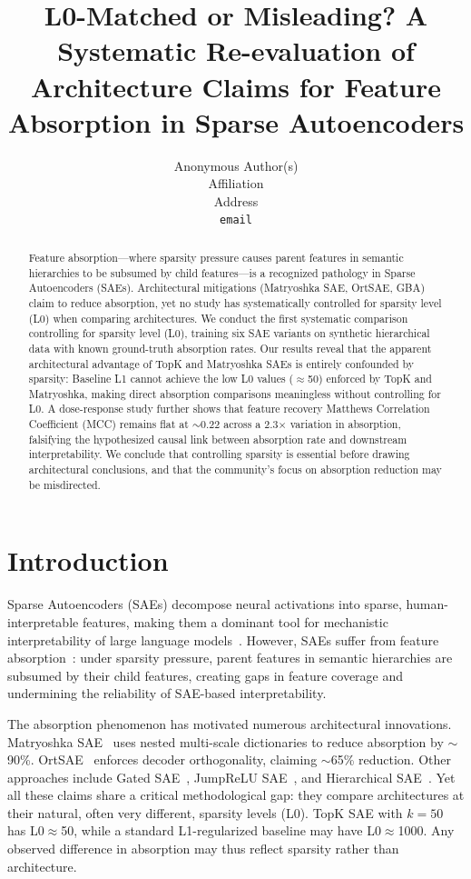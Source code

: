 \documentclass{article}
\title{L0-Matched or Misleading? A Systematic Re-evaluation of Architecture Claims for Feature Absorption in Sparse Autoencoders}
\author{%
  Anonymous Author(s) \\
  Affiliation \\
  Address \\
  \texttt{email} \\
}
\begin{document}
\maketitle

\begin{abstract}
Feature absorption---where sparsity pressure causes parent features in semantic hierarchies to be subsumed by child features---is a recognized pathology in Sparse Autoencoders (SAEs). Architectural mitigations (Matryoshka SAE, OrtSAE, GBA) claim to reduce absorption, yet no study has systematically controlled for sparsity level (L0) when comparing architectures. We conduct the first systematic comparison controlling for sparsity level (L0), training six SAE variants on synthetic hierarchical data with known ground-truth absorption rates. Our results reveal that the apparent architectural advantage of TopK and Matryoshka SAEs is entirely confounded by sparsity: Baseline L1 cannot achieve the low L0 values ($\approx$50) enforced by TopK and Matryoshka, making direct absorption comparisons meaningless without controlling for L0. A dose-response study further shows that feature recovery Matthews Correlation Coefficient (MCC) remains flat at $\sim$0.22 across a 2.3$\times$ variation in absorption, falsifying the hypothesized causal link between absorption rate and downstream interpretability. We conclude that controlling sparsity is essential before drawing architectural conclusions, and that the community's focus on absorption reduction may be misdirected.
\end{abstract}

\section{Introduction}

Sparse Autoencoders (SAEs) decompose neural activations into sparse, human-interpretable features, making them a dominant tool for mechanistic interpretability of large language models~\citep{bricken2023monosemanticity}. However, SAEs suffer from feature absorption~\citep{chanin2024absorption}: under sparsity pressure, parent features in semantic hierarchies are subsumed by their child features, creating gaps in feature coverage and undermining the reliability of SAE-based interpretability.

The absorption phenomenon has motivated numerous architectural innovations. Matryoshka SAE~\citep{bussmann2025matryoshka} uses nested multi-scale dictionaries to reduce absorption by $\sim$90\%. OrtSAE~\citep{anonymous2025ortsae} enforces decoder orthogonality, claiming $\sim$65\% reduction. Other approaches include Gated SAE~\citep{anonymous2024gated}, JumpReLU SAE~\citep{anonymous2024jumprelu}, and Hierarchical SAE~\citep{anonymous2026hierarchical}. Yet all these claims share a critical methodological gap: they compare architectures at their natural, often very different, sparsity levels (L0). TopK SAE with $k=50$ has L0$\approx$50, while a standard L1-regularized baseline may have L0$\approx$1000. Any observed difference in absorption may thus reflect sparsity rather than architecture.
\end{document}
